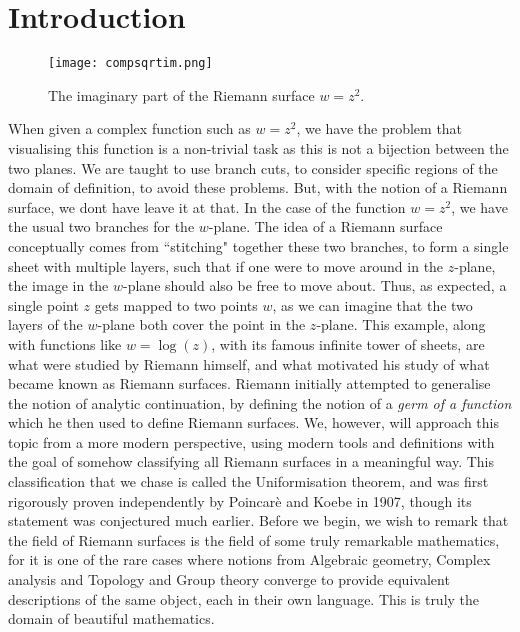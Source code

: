 \documentclass[11pt]{report}
\theoremstyle{definition}
\begin{document}
\chapter*{Introduction}
\begin{wrapfigure}{l}{0.3\textwidth}
  \begin{center}
    \texttt{[image: compsqrtim.png]}
    \caption*{The imaginary part of the Riemann surface $w=z^2$.}
  \end{center}
\end{wrapfigure} When given a complex function such as $w=z^2$, we have the problem that visualising this function is a non-trivial task as this is not a bijection between the two planes. We are taught to use branch cuts, to consider specific regions of the domain of definition, to avoid these problems. But, with the notion of a Riemann surface, we dont have leave it at that. In the case of the function $w = z^2$, we have the usual two branches for the $w$-plane. The idea of a Riemann surface conceptually comes from ``stitching" together these two branches, to form a single sheet with multiple layers, such that if one were to move around in the $z$-plane, the image in the $w$-plane should also be free to move about. Thus, as expected, a single point $z$ gets mapped to two points $w$, as we can imagine that the two layers of the $w$-plane both cover the point in the $z$-plane. This example, along with functions like $w = \log(z)$, with its famous infinite tower of sheets, are what were studied by Riemann himself, and what motivated his study of what became known as Riemann surfaces. Riemann initially attempted to generalise the notion of analytic continuation, by defining the notion of a \emph{germ of a function} which he then used to define Riemann surfaces. We, however, will approach this topic from a more modern perspective, using modern tools and definitions with the goal of somehow classifying all Riemann surfaces in a meaningful way. This classification that we chase is called the Uniformisation theorem, and was first rigorously proven independently by Poincar\`{e} and Koebe in 1907, though its statement was conjectured much earlier. Before we begin, we wish to remark that the field of Riemann surfaces is the field of some truly remarkable mathematics, for it is one of the rare cases where notions from Algebraic geometry, Complex analysis and Topology and Group theory converge to provide equivalent descriptions of the same object, each in their own language. This is truly the domain of beautiful mathematics.
\end{document}
